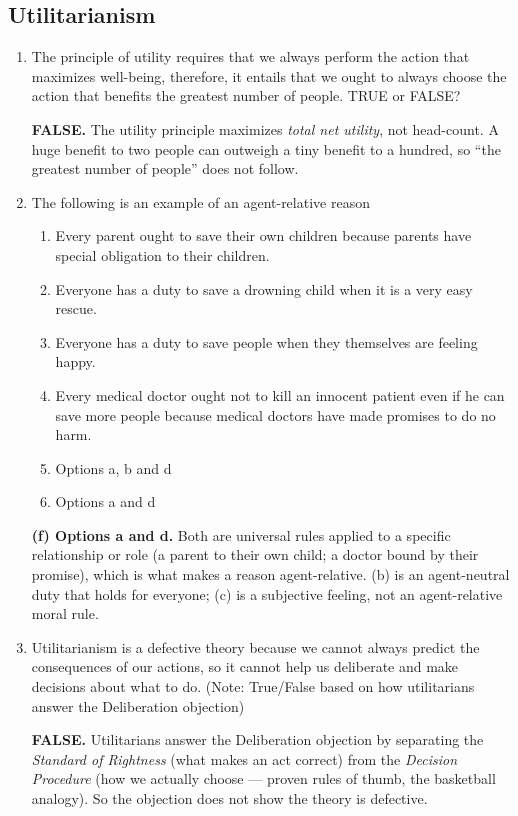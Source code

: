 \documentclass[12pt]{article}
\begin{document}
\subsection{Utilitarianism}
\begin{enumerate}
    \item The principle of utility requires that we always perform the action that maximizes well-being, therefore, it entails that we ought to always choose the action that benefits the greatest number of people. TRUE or FALSE?
    \begin{answer}\textbf{FALSE.} The utility principle maximizes \emph{total net utility}, not head-count. A huge benefit to two people can outweigh a tiny benefit to a hundred, so ``the greatest number of people'' does not follow.\end{answer}
    \item The following is an example of an agent-relative reason
    \begin{enumerate}
        \item Every parent ought to save their own children because parents have special obligation to their children.
        \item Everyone has a duty to save a drowning child when it is a very easy rescue.
        \item Everyone has a duty to save people when they themselves are feeling happy.
        \item Every medical doctor ought not to kill an innocent patient even if he can save more people because medical doctors have made promises to do no harm.
        \item Options a, b and d
        \item Options a and d
    \end{enumerate}
    \begin{answer}\textbf{(f) Options a and d.} Both are universal rules applied to a specific relationship or role (a parent to their own child; a doctor bound by their promise), which is what makes a reason agent-relative. (b) is an agent-neutral duty that holds for everyone; (c) is a subjective feeling, not an agent-relative moral rule.\end{answer}
    \item Utilitarianism is a defective theory because we cannot always predict the consequences of our actions, so it cannot help us deliberate and make decisions about what to do. (Note: True/False based on how utilitarians answer the Deliberation objection)
    \begin{answer}\textbf{FALSE.} Utilitarians answer the Deliberation objection by separating the \emph{Standard of Rightness} (what makes an act correct) from the \emph{Decision Procedure} (how we actually choose --- proven rules of thumb, the basketball analogy). So the objection does not show the theory is defective.\end{answer}
\end{enumerate}
\end{document}
